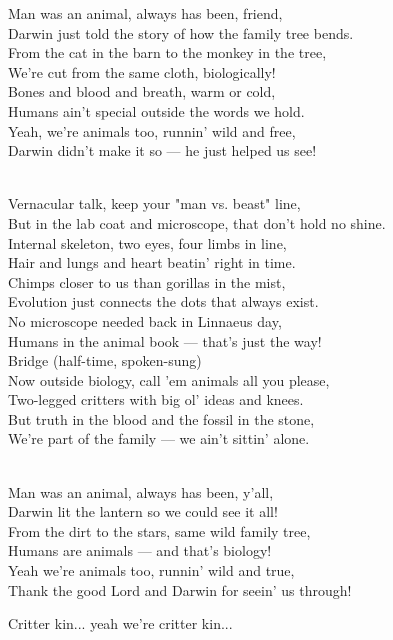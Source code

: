 \begin{lyrics}
Man was an animal, always has been, friend,\\
Darwin just told the story of how the family tree bends.\\
From the cat in the barn to the monkey in the tree,\\
We're cut from the same cloth, biologically!\\
Bones and blood and breath, warm or cold,\\
Humans ain't special outside the words we hold.\\
Yeah, we're animals too, runnin' wild and free,\\
Darwin didn't make it so — he just helped us see!

 \\
Vernacular talk, keep your "man vs. %
beast" line,\\
But in the lab coat and microscope, that don't hold no shine.\\
Internal skeleton, two eyes, four limbs in line,\\
Hair and lungs and heart beatin' right in time.\\
Chimps closer to us than gorillas in the mist,\\
Evolution just connects the dots that always exist.\\
No microscope needed back in Linnaeus day,\\
Humans in the animal book — that's just the way!\\
Bridge (half-time, spoken-sung)\\
Now outside biology, call 'em animals all you please,\\
Two-legged critters with big ol' ideas and knees.\\
But truth in the blood and the fossil in the stone,\\
We're part of the family — we ain't sittin' alone.

 \\
Man was an animal, always has been, y'all,\\
Darwin lit the lantern so we could see it all!\\
From the dirt to the stars, same wild family tree,\\
Humans are animals — and that's biology!\\
Yeah we're animals too, runnin' wild and true,\\
Thank the good Lord and Darwin for seein' us through!

Critter kin... %
yeah we're critter kin...
\end{lyrics}


